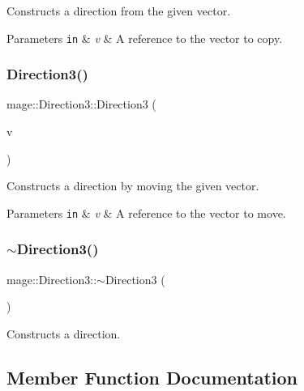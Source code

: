Constructs a direction from the given vector.


\begin{DoxyParams}[1]{Parameters}
\mbox{\tt in}  & {\em v} & A reference to the vector to copy. \\
\hline
\end{DoxyParams}
\hypertarget{structmage_1_1_direction3_a132a0633d3da6c63e533d8bf310bde48}{}\label{structmage_1_1_direction3_a132a0633d3da6c63e533d8bf310bde48} 
\subsubsection{\texorpdfstring{Direction3()}{Direction3()}\hspace{0.1cm}{\footnotesize\ttfamily [8/8]}}
{\footnotesize\ttfamily mage\+::\+Direction3\+::\+Direction3 (\begin{DoxyParamCaption}\item[{X\+M\+F\+L\+O\+A\+T3 \&\&}]{v }\end{DoxyParamCaption})\hspace{0.3cm}{\ttfamily [explicit]}}

Constructs a direction by moving the given vector.


\begin{DoxyParams}[1]{Parameters}
\mbox{\tt in}  & {\em v} & A reference to the vector to move. \\
\hline
\end{DoxyParams}
\hypertarget{structmage_1_1_direction3_a583c087dc366d206aaf54a33bc90c50b}{}\label{structmage_1_1_direction3_a583c087dc366d206aaf54a33bc90c50b} 
\subsubsection{\texorpdfstring{$\sim$\+Direction3()}{~Direction3()}}
{\footnotesize\ttfamily mage\+::\+Direction3\+::$\sim$\+Direction3 (\begin{DoxyParamCaption}{ }\end{DoxyParamCaption})\hspace{0.3cm}{\ttfamily [default]}}

Constructs a direction. 

\subsection{Member Function Documentation}
\hypertarget{structmage_1_1_direction3_a3b3251fcafc37b39bad2c89e5faa09bd}{}\label{structmage_1_1_direction3_a3b3251fcafc37b39bad2c89e5faa09bd} 

